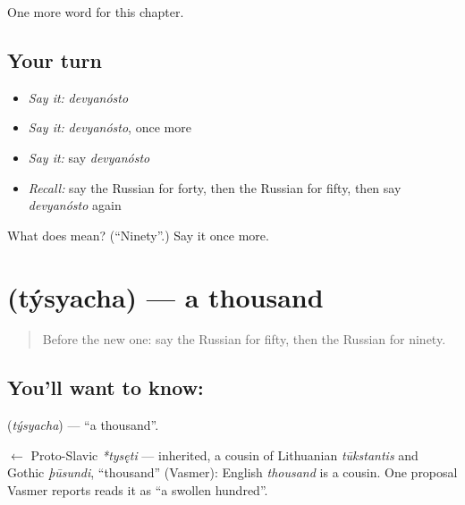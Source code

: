 \begin{grammarlens}[title={What you've built}]
One more word for this chapter.
\end{grammarlens}

\subsection*{Your turn}
\begin{itemize}
\raggedright
  \item \emph{Say it:} \emph{devyanósto}
  \item \emph{Say it:} \emph{devyanósto}, once more
  \item \emph{Say it:} say \emph{devyanósto}
  \item \emph{Recall:} say the Russian for forty, then the Russian for fifty, then say \emph{devyanósto} again
\end{itemize}

\begin{tcolorbox}[breakable,colback=teal!4,colframe=teal!35!black,title={Before you move on}]
What does  mean? (\textquotedblleft{}Ninety\textquotedblright{}.) Say it once more.
\end{tcolorbox}
\section[\texorpdfstring{\ru{тысяча} (týsyacha)}{тысяча (týsyacha)}]{ (týsyacha) — a thousand}

\label{lesson:RU-C76-thousand}



\begin{quote}
Before the new one: say the Russian for fifty, then the Russian for ninety.
\end{quote}

\subsection*{You'll want to know: }
\textbf{} (\emph{týsyacha}) — \textquotedblleft{}a thousand\textquotedblright{}.

\begin{cousinweb}
\textbf{} $\leftarrow$ Proto-Slavic \emph{*tysęti} — inherited, a cousin of Lithuanian \emph{tūkstantis} and Gothic \emph{þūsundi}, \textquotedblleft{}thousand\textquotedblright{} (Vasmer): English \emph{thousand} is a cousin. One proposal Vasmer reports reads it as \textquotedblleft{}a swollen hundred\textquotedblright{}.
\end{cousinweb}

